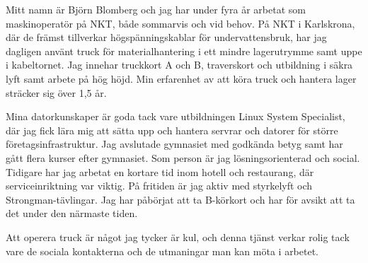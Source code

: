 Mitt namn är Björn Blomberg och jag har under fyra år arbetat som maskinoperatör på NKT, både sommarvis och vid behov. På NKT i Karlskrona, där de främst tillverkar högspänningskablar för undervattensbruk, har jag dagligen använt truck för materialhantering i ett mindre lagerutrymme samt uppe i kabeltornet. Jag innehar truckkort A och B, traverskort och utbildning i säkra lyft samt arbete på hög höjd. Min erfarenhet av att köra truck och hantera lager sträcker sig över 1,5 år.

\vspace{6pt}
Mina datorkunskaper är goda tack vare utbildningen Linux System Specialist, där jag fick lära mig att sätta upp och hantera servrar och datorer för större företagsinfrastruktur. Jag avslutade gymnasiet med godkända betyg samt har gått flera kurser efter gymnasiet. Som person är jag lösningsorienterad och social. Tidigare har jag arbetat en kortare tid inom hotell och restaurang, där serviceinriktning var viktig. På fritiden är jag aktiv med styrkelyft och Strongman-tävlingar. Jag har påbörjat att ta B-körkort och har för avsikt att ta det under den närmaste tiden.

\vspace{6pt}
Att operera truck är något jag tycker är kul, och denna tjänst verkar rolig tack vare de sociala kontakterna och de utmaningar man kan möta i arbetet.